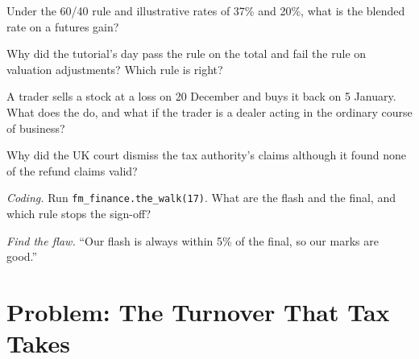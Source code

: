 \begin{exercise}[$\star$]\label{exo:fm:finance-product-control-and-tax:3}
Under the 60/40 rule and illustrative rates of 37\% and 20\%, what is the blended rate on a futures gain?
\end{exercise}

\begin{exercise}[$\star\star$]\label{exo:fm:finance-product-control-and-tax:4}
Why did the tutorial's day pass the rule on the total and fail the rule on valuation adjustments? Which rule is right?
\end{exercise}

\begin{exercise}[$\star\star$]\label{exo:fm:finance-product-control-and-tax:5}
A trader sells a stock at a loss on 20 December and buys it back on 5 January. What does the  do, and what if the trader is a dealer
acting in the ordinary course of business?
\end{exercise}

\begin{exercise}[$\star\star$]\label{exo:fm:finance-product-control-and-tax:6}
Why did the UK court dismiss the tax authority's claims although it found none of the refund claims valid?
\end{exercise}

\begin{exercise}[$\star\star\star$]\label{exo:fm:finance-product-control-and-tax:7}
\emph{Coding.} Run \texttt{fm\_finance.the\_walk(17)}. What are the flash and the final, and which rule stops the sign-off?
\end{exercise}

\begin{exercise}[$\star\star\star$]\label{exo:fm:finance-product-control-and-tax:8}
\emph{Find the flaw.} ``Our flash is always within 5\% of the final, so our marks are good.''
\end{exercise}

\section{Problem: The Turnover That Tax Takes}

